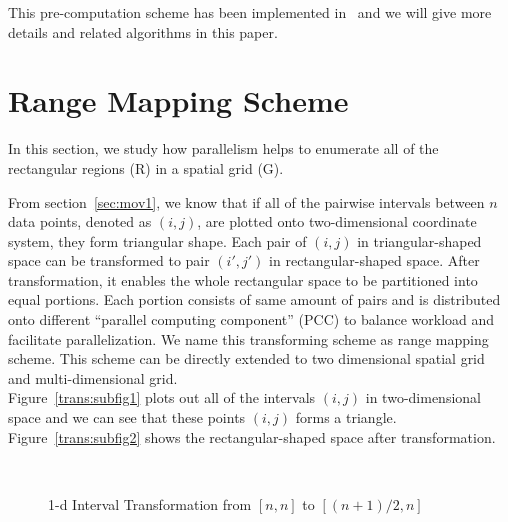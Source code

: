 \documentclass[AMA,LATO1COL]{WileyNJD-v2}
\begin{document}
This pre-computation scheme has been implemented in~\cite{apweb} and we will give more details and related algorithms in this paper.

\section {Range Mapping Scheme} \label{RMS}
In this section, we study how parallelism helps to enumerate all of the rectangular regions (R) in a spatial grid (G).

From section~\ref{sec:mov1}, we know that if all of the pairwise intervals between $n$ data points, denoted as $(i,j)$, are plotted onto two-dimensional coordinate system, they form triangular shape. Each pair of $(i,j)$ in triangular-shaped space can be transformed to pair $(i',j')$ in rectangular-shaped space. After transformation, it enables the whole rectangular space to be partitioned into equal portions. Each portion consists of same amount of pairs and is distributed onto different ``parallel computing component'' (PCC) to balance workload and facilitate parallelization. We name this transforming scheme as range mapping scheme. This scheme can be directly extended to two dimensional spatial grid and multi-dimensional grid.\\
Figure~\ref{trans:subfig1} plots out all of the intervals $(i,j)$ in two-dimensional space and we can see that these points $(i,j)$ forms a triangle. Figure~\ref{trans:subfig2} shows the rectangular-shaped space after transformation.

\begin{figure}[h]
\centering
{}
~~
\caption{1-d Interval Transformation from $[n,n]$ to $[(n+1)/2,n]$}\label{modelBF}
\end{figure}
\end{document}
